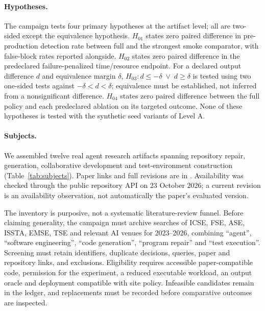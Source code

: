 \paragraph{Hypotheses.} The campaign tests four primary hypotheses at the artifact level; all are two-sided except the equivalence hypothesis. $H_{01}$ states zero paired difference in pre-production detection rate between full \tool{} and the strongest smoke comparator, with false-block rates reported alongside. $H_{02}$ states zero paired difference in the predeclared failure-penalized time/resource endpoint. For a declared output difference $d$ and equivalence margin $\delta$, $H_{03}:d\leq-\delta\;\lor\;d\geq\delta$ is tested using two one-sided tests against $-\delta<d<\delta$; equivalence must be established, not inferred from a nonsignificant difference. $H_{04}$ states zero paired difference between the full policy and each predeclared ablation on its targeted outcome. None of these hypotheses is tested with the synthetic seed variants of Level A.

\paragraph{Subjects.} We assembled twelve real agent research artifacts spanning repository repair, generation, collaborative development and test-environment construction (Table~\ref{tab:subjects}). Paper links and full revisions are in . Availability was checked through the public repository API on 23 October 2026; a current revision is an availability observation, not automatically the paper's evaluated version.
\begin{table}[t]
\caption{Candidate artifacts of the prospective campaign. Every comparative execution status is currently \emph{not run}. HEADs are availability observations, not validated paper-version pins.}\label{tab:subjects}
\small
\end{table}

The inventory is purposive, not a systematic literature-review funnel. Before claiming generality, the campaign must archive searches of ICSE, FSE, ASE, ISSTA, EMSE, TSE and relevant AI venues for 2023--2026, combining ``agent'', ``software engineering'', ``code generation'', ``program repair'' and ``test execution''. Screening must retain identifiers, duplicate decisions, queries, paper and repository links, and exclusions. Eligibility requires accessible paper-compatible code, permission for the experiment, a reduced executable workload, an output oracle and deployment compatible with site policy. Infeasible candidates remain in the ledger, and replacements must be recorded before comparative outcomes are inspected.

